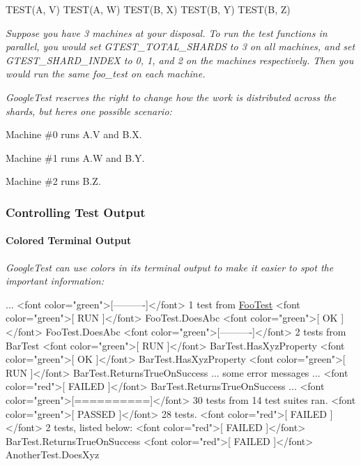 {\itshape 
\begin{DoxyCode}
TEST(A, V)
TEST(A, W)
TEST(B, X)
TEST(B, Y)
TEST(B, Z)
\end{DoxyCode}
}

{\itshape Suppose you have 3 machines at your disposal. To run the test functions in parallel, you would set {\ttfamily G\+T\+E\+S\+T\+\_\+\+T\+O\+T\+A\+L\+\_\+\+S\+H\+A\+R\+DS} to 3 on all machines, and set {\ttfamily G\+T\+E\+S\+T\+\_\+\+S\+H\+A\+R\+D\+\_\+\+I\+N\+D\+EX} to 0, 1, and 2 on the machines respectively. Then you would run the same {\ttfamily foo\+\_\+test} on each machine.}

{\itshape Google\+Test reserves the right to change how the work is distributed across the shards, but here\textquotesingle{}s one possible scenario\+:}

{\itshape 
\begin{DoxyItemize}
\item Machine \#0 runs {\ttfamily A.\+V} and {\ttfamily B.\+X}.
\item Machine \#1 runs {\ttfamily A.\+W} and {\ttfamily B.\+Y}.
\item Machine \#2 runs {\ttfamily B.\+Z}.
\end{DoxyItemize}}

{\itshape \subsubsection*{Controlling Test Output}}

{\itshape }

{\itshape \paragraph*{Colored Terminal Output}}

{\itshape }

{\itshape Google\+Test can use colors in its terminal output to make it easier to spot the important information\+:}

{\itshape 
\begin{DoxyPre}...
<font color="green">[----------]</font> 1 test from \mbox{\hyperlink{classFooTest}{FooTest}}
<font color="green">[ RUN      ]</font> FooTest.DoesAbc
<font color="green">[       OK ]</font> FooTest.DoesAbc
<font color="green">[----------]</font> 2 tests from BarTest
<font color="green">[ RUN      ]</font> BarTest.HasXyzProperty
<font color="green">[       OK ]</font> BarTest.HasXyzProperty
<font color="green">[ RUN      ]</font> BarTest.ReturnsTrueOnSuccess
... some error messages ...
<font color="red">[   FAILED ]</font> BarTest.ReturnsTrueOnSuccess
...
<font color="green">[==========]</font> 30 tests from 14 test suites ran.
<font color="green">[   PASSED ]</font> 28 tests.
<font color="red">[   FAILED ]</font> 2 tests, listed below:
<font color="red">[   FAILED ]</font> BarTest.ReturnsTrueOnSuccess
<font color="red">[   FAILED ]</font> AnotherTest.DoesXyz\end{DoxyPre}
}

